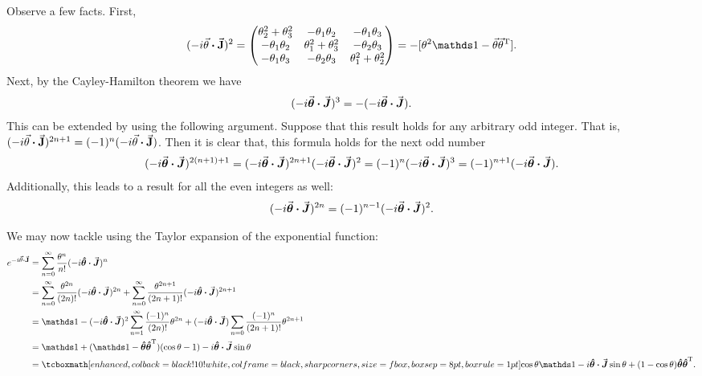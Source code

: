 Observe a few facts.
First,
\begin{eqnarray}
    \label{eq:M-sq}
    (-i \va{\theta} \vdot \va{J})^2 = 
    \begin{pmatrix}
        \theta_2^2 + \theta_3^2 & -\theta_1\theta_2 & -\theta_1\theta_3 \\
        -\theta_1\theta_2 & \theta_1^2 + \theta_3^2 & -\theta_2\theta_3 \\
        -\theta_1\theta_3 & -\theta_2\theta_3 & \theta_1^2 + \theta_2^2
    \end{pmatrix}
    = -[\theta^2\id - \va{\theta}\va{\theta}^{\rm T}]
.\end{eqnarray}
Next, by the Cayley-Hamilton theorem we have
\begin{eqnarray}
    \label{eq:M-characteristic-solve}
    (-i \va*{\theta} \vdot \va*{J})^{3} = -(-i \va*{\theta} \vdot \va*{J})
.\end{eqnarray}
This can be extended by using the following argument.
Suppose that this result holds for any arbitrary odd integer.
That is, $(-i \va{\theta} \vdot \va{J})^{2n+1} = (-1)^{n}(-i \va{\theta} \vdot \va{J})$.
Then it is clear that, this formula holds for the next odd number
\begin{eqnarray}
    \label{eq:general-odd}
    (-i \va*{\theta} \vdot \va*{J})^{2(n+1)+1} = (-i \va*{\theta} \vdot \va*{J})^{2n+1}(-i \va*{\theta} \vdot \va*{J})^2 = (-1)^{n} (-i \va*{\theta} \vdot \va*{J})^{3} = (-1)^{n+1}(-i \va*{\theta} \vdot \va*{J})
.\end{eqnarray}
Additionally, this leads to a result for all the even integers as well:
\begin{eqnarray}
    \label{eq:general-even}
    (-i \va*{\theta} \vdot \va*{J})^{2n} = (-1)^{n-1}(-i \va*{\theta} \vdot \va*{J})^2
.\end{eqnarray}

We may now tackle  using the Taylor expansion of the exponential function:
\begin{align}
    \label{eq:derive-identities}
    e^{-i \va{\theta} \vdot \va{J}} &= \sum_{n=0}^{\infty} \frac{\theta^{n}}{n!}(-i \vu*{\theta} \vdot \va*{J})^{n} \notag \\
    &= \sum_{n=0}^{\infty} \frac{\theta^{2n}}{(2n)!}(-i \vu*{\theta} \vdot \va*{J})^{2n} + \sum_{n=0}^{\infty} \frac{\theta^{2n+1}}{(2n+1)!} (-i\vu*{\theta} \vdot \va*{J})^{2n+1} \notag \\
    &= \id -(-i \vu*{\theta} \vdot \va*{J})^2\sum_{n=1}^{\infty} \frac{(-1)^{n}}{(2n)!} \theta^{2n} + (-i \vu*{\theta} \vdot \va*{J}) \sum_{n=0} \frac{(-1)^{n}}{(2n+1)!} \theta^{2n+1} \notag \\
    &= \id + (\id - \vu*{\theta}\vu*{\theta}^{\rm T})(\cos{\theta} - 1) - i \vu*{\theta} \vdot \va*{J} \sin{\theta} \notag \\
    &= \eqbox{\cos{\theta}\id - i\vu*{\theta} \vdot \va*{J} \sin{\theta} + (1-\cos{\theta})\vu*{\theta}\vu*{\theta}^{\rm T}}
.\end{align}



